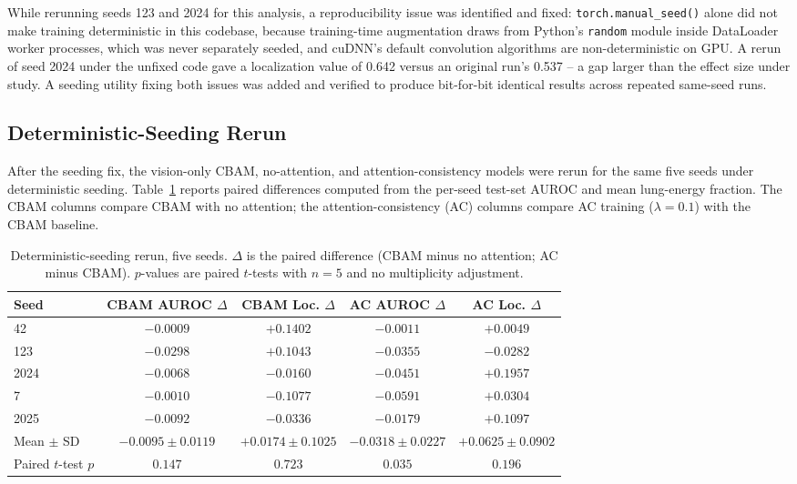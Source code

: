 While rerunning seeds 123 and 2024 for this analysis, a reproducibility
issue was identified and fixed: \texttt{torch.manual\_seed()} alone did not
make training deterministic in this codebase, because training-time
augmentation draws from Python's \texttt{random} module inside DataLoader
worker processes, which was never separately seeded, and cuDNN's default
convolution algorithms are non-deterministic on GPU. A rerun of seed 2024
under the unfixed code gave a localization value of 0.642 versus an
original run's 0.537 -- a gap larger than the effect size under study. A
seeding utility fixing both issues was added and verified to produce
bit-for-bit identical results across repeated same-seed runs.

\subsection{Deterministic-Seeding Rerun}
\label{sec:deterministic-rerun}

After the seeding fix, the vision-only CBAM, no-attention, and
attention-consistency models were rerun for the same five seeds under
deterministic seeding. Table~\ref{tab:deterministic} reports paired
differences computed from the per-seed test-set AUROC and mean lung-energy
fraction. The CBAM columns compare CBAM with no attention; the attention-consistency
(AC) columns compare AC training ($\lambda=0.1$) with the CBAM baseline.

\begin{table}[htbp]
\centering
\caption{Deterministic-seeding rerun, five seeds. $\Delta$ is the paired
difference (CBAM minus no attention; AC minus CBAM). $p$-values are paired
$t$-tests with $n=5$ and no multiplicity adjustment.}
\label{tab:deterministic}
\small
\begin{tabular}{lcccc}
\toprule
Seed & CBAM AUROC $\Delta$ & CBAM Loc. $\Delta$ & AC AUROC $\Delta$ & AC Loc. $\Delta$ \\
\midrule
42   & $-0.0009$ & $+0.1402$ & $-0.0011$ & $+0.0049$ \\
123  & $-0.0298$ & $+0.1043$ & $-0.0355$ & $-0.0282$ \\
2024 & $-0.0068$ & $-0.0160$ & $-0.0451$ & $+0.1957$ \\
7    & $-0.0010$ & $-0.1077$ & $-0.0591$ & $+0.0304$ \\
2025 & $-0.0092$ & $-0.0336$ & $-0.0179$ & $+0.1097$ \\
\midrule
Mean $\pm$ SD & $-0.0095 \pm 0.0119$ & $+0.0174 \pm 0.1025$ & $-0.0318 \pm 0.0227$ & $+0.0625 \pm 0.0902$ \\
Paired $t$-test $p$ & $0.147$ & $0.723$ & $0.035$ & $0.196$ \\
\bottomrule
\end{tabular}
\end{table}

